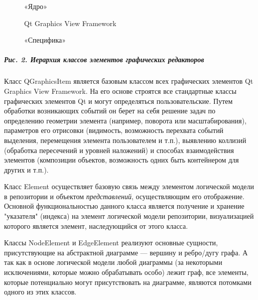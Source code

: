 \documentclass[a5paper]{article}
\begin{document}
\begin{figure}
\begin{center}
\begin{minipage}{2.849cm}

«Ядро»
\end{minipage}
\end{center}
\end{figure}
\begin{figure}
\begin{center}
\begin{minipage}{6.024cm}
{
Qt Graphics View Framework}
\end{minipage}
\end{center}
\end{figure}
\begin{figure}
\begin{center}
\begin{minipage}{3.801cm}

«Специфика»
\end{minipage}
\end{center}
\end{figure}
\subparagraph[Рис. 2. Иерархия классов элементов графических
редакторов]{Рис. 2. Иерархия классов элементов графических редакторов}


Класс QGraphicsItem является базовым классом всех графических элементов Qt
Graphics View Framework. На его основе строятся все
стандартные классы графических элементов Qt
и могут определяться пользовательские. Путем обработки возникающих
событий он берет на себя решение задач по определению геометрии
элемента (например, поворота или масштабирования), параметров его
отрисовки (видимость, возможность перехвата событий выделения,
перемещения элемента пользователем и т.п.), выявлению коллизий
(обработка пересечений и уровней наложений) и способах взаимодействия
элементов (композиции объектов, возможность одних быть контейнером для
других и т.п.).

Класс Element осуществляет базовую связь
между элементом логической модели в репозитории и объектом
\textit{представлений}, осуществляющим его отображение. Основной
функциональностью данного класса является получение и хранение
"указателя" (индекса) на элемент логической модели репозитории,
визуализацией которого является элемент, наследующийся от этого класса.

Классы NodeElement и EdgeElement реализуют основные сущности,
присутствующие на абстрактной диаграмме –-- вершину и ребро/дугу графа. А
так как в основе логической модели любой диаграммы (за некоторыми
исключениями, которые можно обрабатывать особо) лежит граф, все
элементы, которые потенциально могут присутствовать на диаграмме,
являются потомками одного из этих классов.
\end{document}
